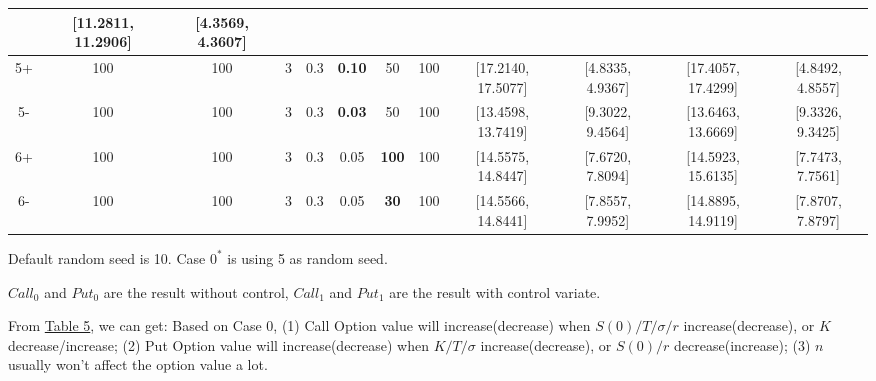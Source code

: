 \documentclass[11pt,a4paper]{article}
\begin{document}
\begin{table}[h]
{\begin{tabular}{|c|c|c|c|c|c|c|c|c|c|c|c|}
            & [11.2811, 11.2906] & [4.3569, 4.3607]\\
            \hline
            5+ & 100 & 100 & 3 & 0.3 & \textbf{0.10} & 50 & 100 
            & [17.2140, 17.5077] & [4.8335, 4.9367] 
            & [17.4057, 17.4299] & [4.8492, 4.8557]\\
            \hline
            5- & 100 & 100 & 3 & 0.3 & \textbf{0.03} & 50 & 100 
            & [13.4598, 13.7419] & [9.3022, 9.4564] 
            & [13.6463, 13.6669] & [9.3326, 9.3425]\\
            \hline
            6+ & 100 & 100 & 3 & 0.3 & 0.05 & \textbf{100} & 100
            & [14.5575, 14.8447] & [7.6720, 7.8094] 
            & [14.5923, 15.6135] & [7.7473, 7.7561]\\
            \hline
            6- & 100 & 100 & 3 & 0.3 & 0.05 & \textbf{30} & 100
            & [14.5566, 14.8441] & [7.8557, 7.9952] 
            & [14.8895, 14.9119] & [7.8707, 7.8797]\\
            \hline
    \end{tabular}
        }
        \footnotesize

    Default random seed is 10. 
    Case $0^*$ is using 5 as random seed.

    $Call_0$ and $Put_0$ are the result without control,
    $Call_1$ and $Put_1$ are the result with control variate.
    \end{table}

    From \hyperref[T5]{Table 5}, we can get: Based on Case 0,
    (1) Call Option value will increase(decrease) when 
    $ S(0) /  T / \sigma / r$ increase(decrease), or
    $ K$ decrease/increase; 
    (2) Put Option value will increase(decrease) when
    $ K / T / \sigma $ increase(decrease), or
    $ S(0) / r$ decrease(increase);
    (3) $n$ usually won't affect the option value a lot.

    
\end{document}
